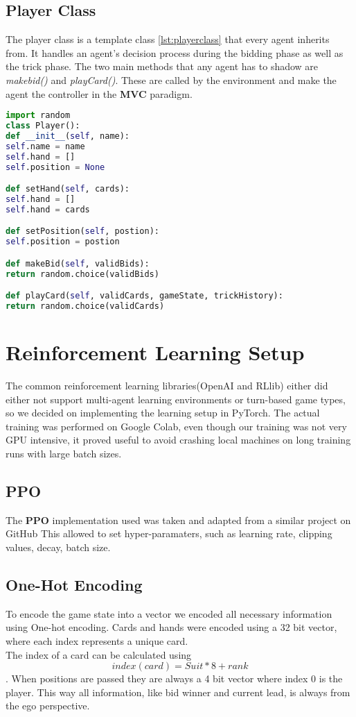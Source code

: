 \subsection{Player Class}
The player class is a template class \ref{lst:playerclass} that every agent inherits from.
It handles an agent's decision process during the bidding phase as well as the trick phase.
The two main methods that any agent has to shadow are \textit{makebid()} and \textit{playCard()}.
These are called by the environment and make the agent the controller in the \textbf{MVC} paradigm.
\newline
\begin{lstlisting}[language=Python,label={lst:playerclass}]
import random
class Player():
def __init__(self, name):
self.name = name
self.hand = []
self.position = None

def setHand(self, cards):
self.hand = []
self.hand = cards

def setPosition(self, postion):
self.position = postion

def makeBid(self, validBids):
return random.choice(validBids)

def playCard(self, validCards, gameState, trickHistory):
return random.choice(validCards)
\end{lstlisting}
\section{Reinforcement Learning Setup}
The common reinforcement learning libraries(OpenAI and RLlib) either did either not support multi-agent learning
environments or turn-based game types, so we decided on implementing the learning setup in PyTorch.
The actual training was performed on Google Colab, even though our training was not very GPU intensive, it proved
useful to avoid crashing local machines on long training runs with large batch sizes.
\subsection{PPO}
The \textbf{PPO} implementation used was taken and adapted from a similar project on GitHub \cite{emerich}
This allowed to set hyper-paramaters, such as learning rate, clipping values, decay, batch size.
\subsection{One-Hot Encoding}
To encode the game state into a vector we encoded all necessary information using One-hot encoding.
Cards and hands were encoded using a 32 bit vector, where each index represents a unique card.\\
The index of a card can be calculated using \[index(card) = Suit * 8 + rank\].
When positions are passed they are always a 4 bit vector where index 0 is the player.
This way all information, like bid winner and current lead, is always from the ego perspective.
